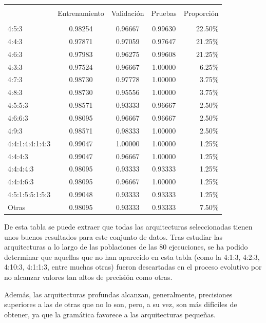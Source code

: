 \documentclass[spanish,a4paper,12pt,twoside]{report}
\begin{document}
\begin{center}
   \label{table}
  \begin{tabular}{l c c c r}
    \hline \\ [-2ex]
    & Entrenamiento & Validación & Pruebas & Proporción \\ [0.5ex]
    \hline \\ [-1ex]
    4:5:3 & 0.98254 & 0.96667 & 0.99630 & 22.50\% \\
    4:4:3 & 0.97871 & 0.97059 & 0.97647 & 21.25\% \\
    4:6:3 & 0.97983 & 0.96275 & 0.99608 & 21.25\% \\
    4:3:3 & 0.97524 & 0.96667 & 1.00000 & 6.25\% \\ 
    4:7:3 & 0.98730 & 0.97778 & 1.00000 & 3.75\% \\ 
    4:8:3 & 0.98730 & 0.95556 & 1.00000 & 3.75\% \\
    4:5:5:3 & 0.98571 & 0.93333 & 0.96667 & 2.50\% \\
    4:6:6:3 & 0.98095 & 0.96667 & 0.96667 & 2.50\% \\
    4:9:3 & 0.98571 & 0.98333 & 1.00000 & 2.50\% \\ 
    4:4:1:4:4:1:4:3 & 0.99047 & 1.00000 & 1.00000 & 1.25\% \\
    4:4:4:3 & 0.99047 & 0.96667 & 1.00000 & 1.25\% \\
    4:4:4:4:3 & 0.98095 & 0.93333 & 0.93333 & 1.25\% \\
    4:4:4:6:3 & 0.98095 & 0.96667 & 1.00000 & 1.25\% \\
    4:5:1:5:5:1:5:3 & 0.99048 & 0.93333 & 0.93333 & 1.25\% \\ 
    Otras & 0.98095 & 0.93333 & 0.93333 & 7.50\% \\ [1ex]
    \hline
  \end{tabular}
\end{center} \par
  De esta tabla se puede extraer que todas las arquitecturas seleccionadas tienen unos buenos resultados para este conjunto de datos. Tras estudiar las arquitecturas a lo largo de las poblaciones de las 80 ejecuciones, se ha podido determinar que aquellas que no han aparecido en esta tabla (como la 4:1:3, 4:2:3, 4:10:3, 4:1:1:3, entre muchas otras) fueron descartadas en el proceso evolutivo por no alcanzar valores tan altos de precisión como otras. \par
  Además, las arquitecturas profundas alcanzan, generalmente, precisiones superiores a las de otras que no lo son, pero, a su vez, son más difíciles de obtener, ya que la gramática favorece a las arquitecturas pequeñas. \par
\end{document}
